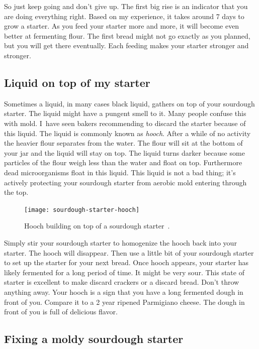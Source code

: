 So just keep going and don't give up. The first big
rise is an indicator that you are doing everything
right. Based on my experience, it takes around 7
days to grow a starter. As you feed your starter
more and more, it will become even better at fermenting
flour. The first bread might not go exactly as you
planned, but you will get there eventually. Each
feeding makes your starter stronger and stronger.

\subsection{Liquid on top of my starter}

Sometimes a liquid, in many cases black liquid, gathers on top
of your sourdough starter. The liquid might have a pungent
smell to it. Many people confuse this with mold. I~have seen
bakers recommending to discard the starter because of this liquid.
The liquid is commonly known as \emph{hooch}. After a while
of no activity the heavier flour separates from the water. The flour
will sit at the bottom of your jar and the liquid will stay on top.
The liquid turns darker because some particles of the flour weigh
less than the water and float on top. Furthermore dead microorganisms
float in this liquid. This liquid is not a bad thing; it's actively
protecting your sourdough starter from aerobic mold entering through
the top.

\begin{figure}[!htb]
\begin{center}
  \texttt{[image: sourdough-starter-hooch]}
  \caption[Hooch] {Hooch building on top of a sourdough
      starter~\cite{liquid+on+starter}.}%
  \label{fig:hooch}
\end{center}
\end{figure}

Simply stir your sourdough starter to homogenize the hooch back
into your starter. The hooch will disappear. Then use a little bit of
your sourdough starter to set up the starter for your next bread.
Once hooch appears, your starter has likely fermented for a long
period of time. It might be very sour. This state of starter
is excellent to make discard crackers or a discard bread. Don't throw
anything away. Your hooch is a sign that you have a long fermented
dough in front of you. Compare it to a 2 year ripened Parmigiano cheese.
The dough in front of you is full of delicious flavor.

\subsection{Fixing a moldy sourdough starter}

